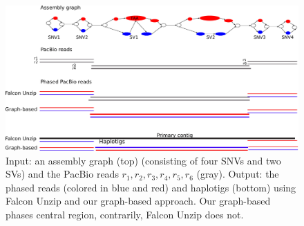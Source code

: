 \begin{figure}[t!]\centering
\includegraphics[width=\columnwidth]{ex_graph_approach.pdf}
\caption{Input: an assembly graph (top) (consisting of four SNVs and two SVs) and the PacBio reads $r_1, r_2, r_3, r_4, r_5, r_6$ (gray). 
Output: the phased reads (colored in blue and red) and haplotigs (bottom) using Falcon Unzip and our graph-based approach. Our graph-based phases central region, contrarily, Falcon Unzip does not.  }
\label{fig:ex_graph_approach}
\end{figure}

